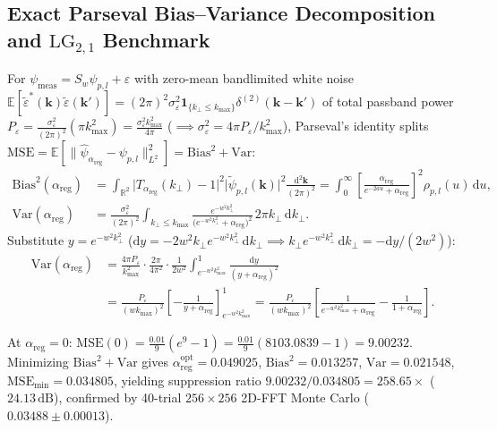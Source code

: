 \documentclass[10pt,letterpaper]{article}
\newcommand{\norm}[1]{\lVert #1 \rVert}
\newcommand{\abs}[1]{\lvert #1 \rvert}
\newcommand{\dd}{\mathrm{d}}
\numberwithin{equation}{section}
\begin{document}
\subsection{Exact Parseval Bias--Variance Decomposition and $\mathrm{LG}_{2,1}$ Benchmark}
For $\psi_{\mathrm{meas}} = S_w\psi_{p,l} + \varepsilon$ with zero-mean bandlimited white noise $\mathbb{E}[\widetilde{\varepsilon}^*(\mathbf{k})\widetilde{\varepsilon}(\mathbf{k}')] = (2\pi)^2\sigma_\varepsilon^2\mathbf{1}_{\{k_\perp \le k_{\max}\}}\delta^{(2)}(\mathbf{k}-\mathbf{k}')$ of total passband power $P_\varepsilon = \frac{\sigma_\varepsilon^2}{(2\pi)^2}(\pi k_{\max}^2) = \frac{\sigma_\varepsilon^2 k_{\max}^2}{4\pi}$ ($\implies \sigma_\varepsilon^2 = 4\pi P_\varepsilon/k_{\max}^2$), Parseval's identity splits $\mathrm{MSE} = \mathbb{E}[\norm{\hat{\psi}_{\alpha_{\mathrm{reg}}} - \psi_{p,l}}_{L^2}^2] = \mathrm{Bias}^2 + \mathrm{Var}$:
\begin{align}
  \mathrm{Bias}^2(\alpha_{\mathrm{reg}}) &= \int_{\mathbb{R}^2} \abs{T_{\alpha_{\mathrm{reg}}}(k_\perp) - 1}^2 \abs{\widetilde{\psi}_{p,l}(\mathbf{k})}^2\frac{\dd^2\mathbf{k}}{(2\pi)^2} = \int_0^\infty \left[\frac{\alpha_{\mathrm{reg}}}{e^{-2au} + \alpha_{\mathrm{reg}}}\right]^2 \rho_{p,l}(u)\,\dd u, \\
  \mathrm{Var}(\alpha_{\mathrm{reg}}) &= \frac{\sigma_\varepsilon^2}{(2\pi)^2}\int_{k_\perp \le k_{\max}} \frac{e^{-w^2 k_\perp^2}}{\bigl(e^{-w^2 k_\perp^2} + \alpha_{\mathrm{reg}}\bigr)^2}\,2\pi k_\perp\,\dd k_\perp.
\end{align}
Substitute $y = e^{-w^2 k_\perp^2}$ ($\dd y = -2w^2 k_\perp e^{-w^2 k_\perp^2}\,\dd k_\perp \implies k_\perp e^{-w^2 k_\perp^2}\,\dd k_\perp = -\dd y/(2w^2)$):
\begin{align}
  \mathrm{Var}(\alpha_{\mathrm{reg}}) &= \frac{4\pi P_\varepsilon}{k_{\max}^2}\cdot\frac{2\pi}{4\pi^2}\cdot\frac{1}{2w^2}\int_{e^{-w^2 k_{\max}^2}}^{1}\frac{\dd y}{(y + \alpha_{\mathrm{reg}})^2} \nonumber \\
  &= \frac{P_\varepsilon}{(w k_{\max})^2}\left[-\frac{1}{y+\alpha_{\mathrm{reg}}}\right]_{e^{-w^2 k_{\max}^2}}^{1}
  = \frac{P_\varepsilon}{(w k_{\max})^2}\left[\frac{1}{e^{-w^2 k_{\max}^2} + \alpha_{\mathrm{reg}}} - \frac{1}{1+\alpha_{\mathrm{reg}}}\right].
\end{align}
\begin{pencheck}[Worked $\mathrm{LG}_{2,1}$ Numerical Substitution ($w/w_0=0.25, w k_{\max}=3.0, P_\varepsilon=0.01$)]
At $\alpha_{\mathrm{reg}} = 0$: $\mathrm{MSE}(0) = \frac{0.01}{9}(e^9 - 1) = \frac{0.01}{9}(8103.0839 - 1) = 9.00232$. Minimizing $\mathrm{Bias}^2 + \mathrm{Var}$ gives $\alpha_{\mathrm{reg}}^{\mathrm{opt}} = 0.049025$, $\mathrm{Bias}^2 = 0.013257$, $\mathrm{Var} = 0.021548$, $\mathrm{MSE}_{\min} = 0.034805$, yielding suppression ratio $9.00232 / 0.034805 = \mathbf{258.65\times}$ ($\mathbf{24.13\,\mathrm{dB}}$), confirmed by 40-trial $256\times 256$ 2D-FFT Monte Carlo ($0.03488 \pm 0.00013$).
\end{pencheck}
\end{document}
